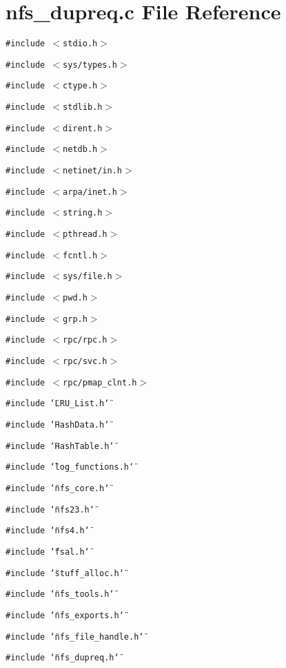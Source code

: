 \section{nfs\_\-dupreq.c File Reference}
\label{nfs__dupreq_8c}
{\tt \#include $<$stdio.h$>$}\par
{\tt \#include $<$sys/types.h$>$}\par
{\tt \#include $<$ctype.h$>$}\par
{\tt \#include $<$stdlib.h$>$}\par
{\tt \#include $<$dirent.h$>$}\par
{\tt \#include $<$netdb.h$>$}\par
{\tt \#include $<$netinet/in.h$>$}\par
{\tt \#include $<$arpa/inet.h$>$}\par
{\tt \#include $<$string.h$>$}\par
{\tt \#include $<$pthread.h$>$}\par
{\tt \#include $<$fcntl.h$>$}\par
{\tt \#include $<$sys/file.h$>$}\par
{\tt \#include $<$pwd.h$>$}\par
{\tt \#include $<$grp.h$>$}\par
{\tt \#include $<$rpc/rpc.h$>$}\par
{\tt \#include $<$rpc/svc.h$>$}\par
{\tt \#include $<$rpc/pmap\_\-clnt.h$>$}\par
{\tt \#include \char`\"{}LRU\_\-List.h\char`\"{}}\par
{\tt \#include \char`\"{}HashData.h\char`\"{}}\par
{\tt \#include \char`\"{}HashTable.h\char`\"{}}\par
{\tt \#include \char`\"{}log\_\-functions.h\char`\"{}}\par
{\tt \#include \char`\"{}nfs\_\-core.h\char`\"{}}\par
{\tt \#include \char`\"{}nfs23.h\char`\"{}}\par
{\tt \#include \char`\"{}nfs4.h\char`\"{}}\par
{\tt \#include \char`\"{}fsal.h\char`\"{}}\par
{\tt \#include \char`\"{}stuff\_\-alloc.h\char`\"{}}\par
{\tt \#include \char`\"{}nfs\_\-tools.h\char`\"{}}\par
{\tt \#include \char`\"{}nfs\_\-exports.h\char`\"{}}\par
{\tt \#include \char`\"{}nfs\_\-file\_\-handle.h\char`\"{}}\par
{\tt \#include \char`\"{}nfs\_\-dupreq.h\char`\"{}}\par
